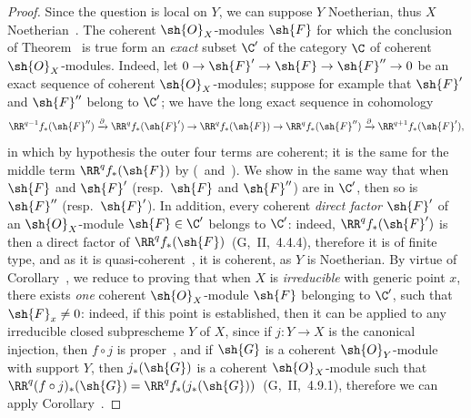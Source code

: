 \begin{proof}
Since the question is local on $Y$, we can suppose $Y$ Noetherian, thus $X$ Noetherian~.
The coherent $\sh{O}_X$-modules $\sh{F}$ for which the conclusion of Theorem~ is true form an \emph{exact} subset $\C'$ of the category $\C$ of coherent $\sh{O}_X$-modules.
Indeed, let $0\to\sh{F}'\to\sh{F}\to\sh{F}''\to 0$ be an exact sequence of coherent $\sh{O}_X$-modules; suppose for example that $\sh{F}'$ and $\sh{F}''$ belong to $\C'$; we have the long exact sequence in cohomology
\[
  \RR^{q-1}f_*(\sh{F}'')\xrightarrow{\partial}\RR^q f_*(\sh{F}')\to\RR^q f_*(\sh{F})\to\RR^q f_*(\sh{F}'')\xrightarrow{\partial}\RR^{q+1}f_*(\sh{F}'),
\]
in which by hypothesis the outer four terms are coherent; it is the same for the middle term $\RR^q f_*(\sh{F})$ by (~and~).
We show in the same way that when $\sh{F}$ and $\sh{F}'$ (resp.~$\sh{F}$ and $\sh{F}''$) are in $\C'$, then so is $\sh{F}''$ (resp.~$\sh{F}'$).
In addition, every coherent \emph{direct factor} $\sh{F}'$ of an $\sh{O}_X$-module $\sh{F}\in\C'$ belongs to $\C'$: indeed, $\RR^q f_*(\sh{F}')$ is then a direct factor of $\RR^q f_*(\sh{F})$~(G,~II,~4.4.4), therefore it is of finite type, and as it is quasi-coherent~, it is coherent, as $Y$ is Noetherian.
By virtue of Corollary~, we reduce to proving that when $X$ is \emph{irreducible} with generic point $x$, there exists \emph{one} coherent $\sh{O}_X$-module $\sh{F}$ belonging to $\C'$, such that $\sh{F}_x\neq 0$: indeed, if this point is established, then it can be applied to any irreducible closed subprescheme $Y$ of $X$, since if $j:Y\to X$ is the canonical injection, then $f\circ j$ is proper~, and if $\sh{G}$ is a coherent $\sh{O}_Y$-module with support $Y$, then $j_*(\sh{G})$ is a coherent $\sh{O}_X$-module such that $\RR^q(f\circ j)_*(\sh{G})=\RR^q f_*(j_*(\sh{G}))$~(G,~II,~4.9.1), therefore we can apply Corollary~.


\end{proof}
